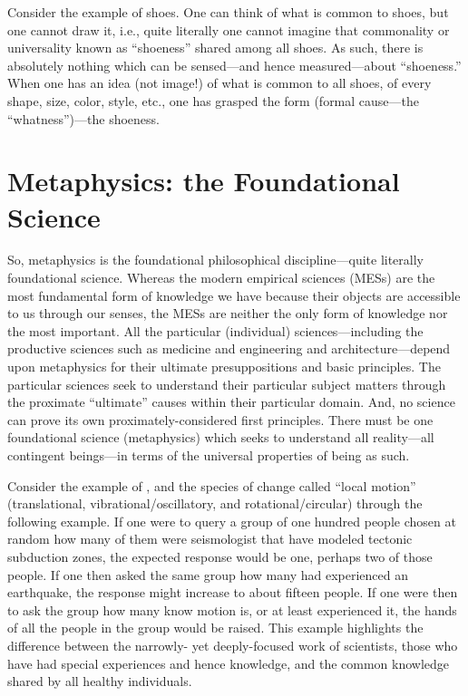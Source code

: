 Consider the example of shoes. One can think of what is common to shoes, but one cannot draw it, i.e., quite literally one cannot imagine that commonality or universality known as ``shoeness'' shared among all shoes. As such, there is absolutely nothing which can be sensed---and hence measured---about ``shoeness.'' When one has an idea (not image!) of what is common to all shoes, of every shape, size, color, style, etc., one has grasped  the form (formal cause---the ``whatness'')---the shoeness.

\section{Metaphysics: the Foundational Science}

So, metaphysics is the foundational philosophical discipline---quite literally  foundational science. Whereas the modern empirical sciences (MESs) are the most fundamental form of knowledge we have because their objects are accessible to us through our senses, the MESs are neither the only form of knowledge nor the most important. All the particular (individual) sciences---including the productive sciences such as medicine and engineering and architecture---depend upon metaphysics for their ultimate presuppositions and basic principles. The particular sciences seek to understand their particular subject matters through the proximate ``ultimate'' causes within their particular domain. And, no science can prove its own proximately-considered first principles. There must be one foundational science (metaphysics) which seeks to understand all reality---all contingent beings---in terms of the universal properties of being as such.

Consider the example of , and the species of change called ``local motion'' (translational, vibrational/oscillatory, and rotational/circular) through the following example. If one were to query a group of one hundred people chosen at random how many of them were seismologist that have modeled tectonic subduction zones, the expected response would be one, perhaps two of those people. If one then asked the same group how many had experienced an earthquake, the response might increase to about fifteen people. If one were then to ask the group how many know  motion is, or at least experienced it, the hands of all the people in the group would be raised. This example highlights the difference between the narrowly- yet deeply-focused work of scientists, those who have had special experiences and hence knowledge, and the common knowledge shared by all healthy individuals.

